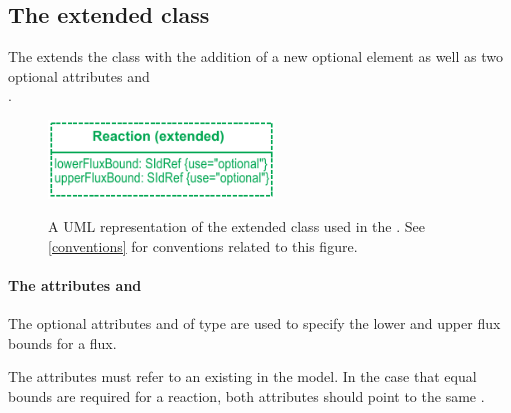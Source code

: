 

\subsection{The extended  class}
\label{reaction-class-ga}

The \FBCPackage extends the \sbmlthreecore \Reaction class with the addition of
a new optional element \GeneProteinAssociation as well as two optional attributes
 and \\
.

\begin{figure}[h]
  \centering
  \includegraphics[width=6cm]{images/v2harmony_fbc_reaction.pdf}\\
  \caption{A UML representation of the extended \SBML \Reaction class used in
  the \FBCPackage. See \ref{conventions} for conventions related to this
  figure.}
  \label{fig:fbc_uml_reaction}
\end{figure}

\paragraph{The attributes  and }
The optional attributes  and  of type  are used to specify the lower and upper flux bounds for a \Reaction flux.

The attributes must refer to an existing \Parameter in the model. In the case that equal bounds are required for a reaction, both attributes should point to the same \Parameter.

